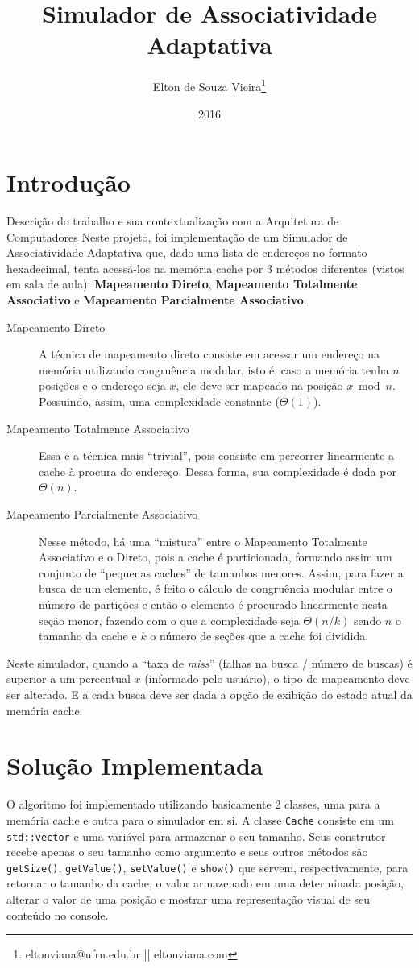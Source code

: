 \documentclass[12pt,openright,oneside,a4paper,english,brazil]{abntex2}
\author{Elton de Souza Vieira\thanks{eltonviana@ufrn.edu.br || eltonviana.com}}
\title{Simulador de Associatividade Adaptativa}
\date{2016}
\newcommand{\code}[1]{\colorbox{codegray}{\texttt{#1}}}
\begin{document}
\imprimircapa

\chapter*{Introdução}
Descrição do trabalho e sua contextualização com a Arquitetura de Computadores
Neste projeto, foi implementação de um Simulador de Associatividade Adaptativa que, dado uma lista de endereços no formato hexadecimal, tenta acessá-los na memória cache por 3 métodos diferentes (vistos em sala de aula): \textbf{Mapeamento Direto}, \textbf{Mapeamento Totalmente Associativo} e \textbf{Mapeamento Parcialmente Associativo}.

\begin{description}
\item[Mapeamento Direto] A técnica de mapeamento direto consiste em acessar um endereço na memória utilizando congruência modular, isto é, caso a memória tenha $ n $ posições e o endereço seja $ x $, ele deve ser mapeado na posição $ x \bmod n $. Possuindo, assim, uma complexidade constante ($ \Theta(1) $).
\item[Mapeamento Totalmente Associativo] Essa é a técnica mais ``trivial'', pois consiste em percorrer linearmente a cache à procura do endereço. Dessa forma, sua complexidade é dada por $ \Theta (n) $.
\item[Mapeamento Parcialmente Associativo] Nesse método, há uma ``mistura'' entre o Mapeamento Totalmente Associativo e o Direto, pois a cache é particionada, formando assim um conjunto de ``pequenas caches'' de tamanhos menores. Assim, para fazer a busca de um elemento, é feito o cálculo de congruência modular entre o número de partições e então o elemento é procurado linearmente nesta seção menor, fazendo com o que a complexidade seja $ \Theta(n/k) $ sendo $ n $ o tamanho da cache e $ k $ o número de seções que a cache foi dividida.
\end{description}

Neste simulador, quando a ``taxa de \textit{miss}'' (falhas na busca / número de buscas) é superior a um percentual $ x $ (informado pelo usuário), o tipo de mapeamento deve ser alterado. E a cada busca deve ser dada a opção de exibição do estado atual da memória cache.

\newpage

\chapter*{Solução Implementada}
O algoritmo foi implementado utilizando basicamente 2 classes, uma para a memória cache e outra para o simulador em si.
A classe \code{Cache} consiste em um \code{std::vector} e uma variável para armazenar o seu tamanho. Seus construtor recebe apenas o seu tamanho como argumento e seus outros métodos são \code{getSize()}, \code{getValue()}, \code{setValue()} e \code{show()} que servem, respectivamente, para retornar o tamanho da cache, o valor armazenado em uma determinada posição, alterar o valor de uma posição e mostrar uma representação visual de seu conteúdo no console.
\end{document}
